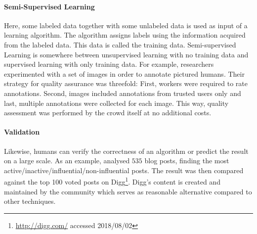 \paragraph{Semi-Supervised Learning} Here, some labeled data together with some unlabeled data is used as input of a learning
algorithm. The algorithm assigns labels using the information acquired from the labeled data. This data is called the training data. Semi-supervised Learning is somewhere between unsupervised learning with no training data and supervised learning with only training data. For example, researchers~\cite{sorokin2008} experimented with a set of images in order to annotate pictured humans. Their strategy for quality assurance was threefold: First, workers were required to rate annotations. Second, images included annotations from trusted users only and last, multiple annotations were collected for each image. This way, quality assessment was performed by the crowd itself at no additional costs. 

\paragraph{Validation} Likewise, humans can verify the correctness of an algorithm or predict the result on a large scale. As an example, \cite{agarwal2008} analysed $535$ blog posts, finding the most active/inactive/influential/non-influential posts. The result was then compared against the top 100 voted posts on Digg\footnote{\url{http://digg.com/} accessed 2018/08/02}. Digg's content is created and maintained by the community which serves as reasonable alternative compared to other techniques.  
